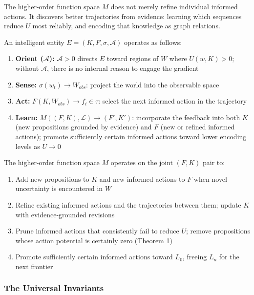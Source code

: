 \documentclass[
]{article}
\providecommand{\tightlist}{%
  \setlength{\itemsep}{0pt}\setlength{\parskip}{0pt}}
\begin{document}
The higher-order function space \(M\) does not merely refine individual
informed actions. It discovers better trajectories from evidence:
learning which sequences reduce \(U\) most reliably, and encoding that
knowledge as graph relations.

An intelligent entity \(E = (K, F, \sigma, \mathcal{A})\) operates as
follows:

\begin{enumerate}
\def\labelenumi{\arabic{enumi}.}
\tightlist
\item
  \textbf{Orient (\(\mathcal{A}\)):} \(\mathcal{A} > 0\) directs \(E\)
  toward regions of \(W\) where \(U(w, K) > 0\); without
  \(\mathcal{A}\), there is no internal reason to engage the gradient
\item
  \textbf{Sense:} \(\sigma(w_t) \rightarrow W_{obs}\): project the world
  into the observable space
\item
  \textbf{Act:} \(F(K, W_{obs}) \rightarrow f_i \in \tau\): select the
  next informed action in the trajectory
\item
  \textbf{Learn:} \(M((F, K), \mathcal{L}) \rightarrow (F', K')\):
  incorporate the feedback into both \(K\) (new propositions grounded by
  evidence) and \(F\) (new or refined informed actions); promote
  sufficiently certain informed actions toward lower encoding levels as
  \(U \rightarrow 0\)
\end{enumerate}

The higher-order function space \(M\) operates on the joint \((F, K)\)
pair to:

\begin{enumerate}
\def\labelenumi{\arabic{enumi}.}
\tightlist
\item
  Add new propositions to \(K\) and new informed actions to \(F\) when
  novel uncertainty is encountered in \(W\)
\item
  Refine existing informed actions and the trajectories between them;
  update \(K\) with evidence-grounded revisions
\item
  Prune informed actions that consistently fail to reduce \(U\); remove
  propositions whose action potential is certainly zero (Theorem 1)
\item
  Promote sufficiently certain informed actions toward \(L_0\), freeing
  \(L_n\) for the next frontier
\end{enumerate}

\subsubsection{The Universal Invariants}\label{the-universal-invariants}
\end{document}
